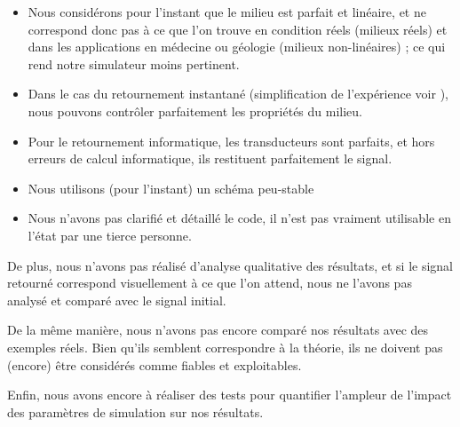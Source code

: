 \documentclass[11pt, a4paper]{article}
\begin{document}
\begin{itemize}
    \item Nous considérons pour l'instant que le milieu est parfait et linéaire, et ne correspond donc pas à ce que l'on trouve en condition réels (milieux réels) et dans les applications en médecine ou géologie (milieux non-linéaires) ; ce qui rend notre simulateur moins pertinent. 

    \item Dans le cas du retournement instantané (simplification de l'expérience voir \cite{ref1}), nous pouvons contrôler parfaitement les propriétés du milieu. 

    \item Pour le retournement informatique, les transducteurs sont parfaits, et hors erreurs de calcul informatique, ils restituent parfaitement le signal. 

    \item Nous utilisons (pour l'instant) un schéma peu-stable 

    \item Nous n'avons pas clarifié et détaillé le code, il n'est pas vraiment utilisable en l'état par une tierce personne. 
\end{itemize}
  

De plus, nous n'avons pas réalisé d'analyse qualitative des résultats, et si le signal retourné correspond visuellement à ce que l'on attend, nous ne l'avons pas analysé et comparé avec le signal initial. 

De la même manière, nous n'avons pas encore comparé nos résultats avec des exemples réels. Bien qu'ils semblent correspondre à la théorie, ils ne doivent pas (encore) être considérés comme fiables et exploitables. 

Enfin, nous avons encore à réaliser des tests pour quantifier l'ampleur de l'impact des paramètres de simulation sur nos résultats. 
\end{document}
